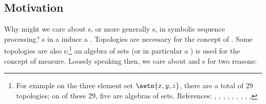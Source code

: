 \subsection{Motivation}
Why might we care about s, or more generally s, 
in symbolic sequence processing?
s in a  induce a . 
Topologies are necessary for the concept of .
Some topologies are also s;\footnote{For example 
  on the three element set $\setn{x,y,z}$, there are a total of 29 topologies;
  on of these 29, five are algebras of sets. %
  References:
  ,
  ,
  ,
  ,
  ,
  ,
  ,
  ,
  ,
  }
an algebra of sets (or in particular a ) is used for the concept of measure.
Loosely speaking then, we care about  and s for two reasons:
